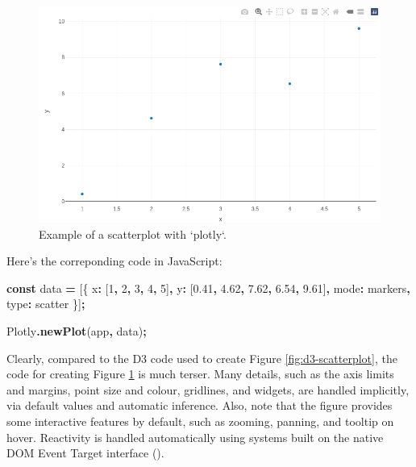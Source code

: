 \documentclass[
]{book}
\newenvironment{Shaded}{\begin{snugshade}}{\end{snugshade}}
\newcommand{\DataTypeTok}[1]{\textcolor[rgb]{0.13,0.29,0.53}{#1}}
\newcommand{\DecValTok}[1]{\textcolor[rgb]{0.00,0.00,0.81}{#1}}
\newcommand{\FloatTok}[1]{\textcolor[rgb]{0.00,0.00,0.81}{#1}}
\newcommand{\FunctionTok}[1]{\textcolor[rgb]{0.13,0.29,0.53}{\textbf{#1}}}
\newcommand{\KeywordTok}[1]{\textcolor[rgb]{0.13,0.29,0.53}{\textbf{#1}}}
\newcommand{\NormalTok}[1]{#1}
\newcommand{\OperatorTok}[1]{\textcolor[rgb]{0.81,0.36,0.00}{\textbf{#1}}}
\newcommand{\StringTok}[1]{\textcolor[rgb]{0.31,0.60,0.02}{#1}}
\theoremstyle{definition}
\theoremstyle{definition}
\theoremstyle{definition}
\theoremstyle{definition}
\theoremstyle{remark}
\begin{document}
\begin{figure}

{\centering \includegraphics[width=1\linewidth,height=1\textheight]{./figures/plotly-scatterplot} 

}

\caption{Example of a scatterplot with `plotly`.}\label{fig:plotly-scatterplot}
\end{figure}

Here's the correponding code in JavaScript:

\begin{Shaded}
\begin{Highlighting}[]
\KeywordTok{const}\NormalTok{ data }\OperatorTok{=}\NormalTok{ [\{}
  \DataTypeTok{x}\OperatorTok{:}\NormalTok{ [}\DecValTok{1}\OperatorTok{,} \DecValTok{2}\OperatorTok{,} \DecValTok{3}\OperatorTok{,} \DecValTok{4}\OperatorTok{,} \DecValTok{5}\NormalTok{]}\OperatorTok{,}
  \DataTypeTok{y}\OperatorTok{:}\NormalTok{ [}\FloatTok{0.41}\OperatorTok{,} \FloatTok{4.62}\OperatorTok{,} \FloatTok{7.62}\OperatorTok{,} \FloatTok{6.54}\OperatorTok{,} \FloatTok{9.61}\NormalTok{]}\OperatorTok{,}
  \DataTypeTok{mode}\OperatorTok{:} \StringTok{\textquotesingle{}markers\textquotesingle{}}\OperatorTok{,}
  \DataTypeTok{type}\OperatorTok{:} \StringTok{\textquotesingle{}scatter\textquotesingle{}}
\NormalTok{\}]}\OperatorTok{;}

\NormalTok{Plotly}\OperatorTok{.}\FunctionTok{newPlot}\NormalTok{(}\StringTok{\textquotesingle{}app\textquotesingle{}}\OperatorTok{,}\NormalTok{ data)}\OperatorTok{;}
\end{Highlighting}
\end{Shaded}

Clearly, compared to the D3 code used to create Figure \ref{fig:d3-scatterplot}, the code for creating Figure \ref{fig:plotly-scatterplot} is much terser. Many details, such as the axis limits and margins, point size and colour, gridlines, and widgets, are handled implicitly, via default values and automatic inference. Also, note that the figure provides some interactive features by default, such as zooming, panning, and tooltip on hover. Reactivity is handled automatically using systems built on the native DOM Event Target interface ().
\end{document}
